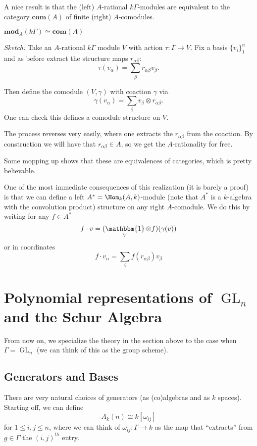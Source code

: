 \documentclass[12pt]{article}
\DeclareMathOperator{\1}{\mathbbm{1}}
\DeclareMathOperator{\GL}{GL}
\begin{document}
A nice result is that the (left) $A$-rational $k\Gamma$-modules are equivalent to the category $\mathbf{com}(A)$ of finite (right) $A$-comodules.
\begin{prop}\label{prop-modcomod}
	$\mathbf{mod}_A(k\Gamma)\simeq \mathbf{com}(A)$
\end{prop}
\begin{prf}
	\textit{Sketch:} Take an $A$-rational $k\Gamma$ module $V$ with action $\tau:\Gamma\to V$. Fix a basis $\{v_i\}_1^n$
	and as before extract the structure maps $r_{\alpha\beta}$:
	\[\tau(v_\alpha)=\sum_\beta r_{\alpha\beta} v_\beta.\]
	
	Then define the comodule $(V,\gamma)$ with coaction $\gamma$ via 
	\[\gamma(v_\alpha)=\sum_\beta v_\beta\otimes r_{\alpha\beta}.\]
	One can check this defines a comodule structure on $V$. 

	The process reverses very easily, where one extracts the $r_{\alpha\beta}$ from the coaction.
	By construction we will have that $r_{\alpha\beta}\in A$, so we get the $A$-rationality for free.

	Some mopping up shows that these are equivalences of categories, which is pretty believable. 
\end{prf}	
\begin{rmk}
	One of the most immediate consequences of this realization (it is barely a proof) is that we can define a left $A^\ast=\Hom_k(A,k)$-module (note that $A^\ast$ is a $k$-algebra with the convolution product)
	structure on any right $A$-comodule. We do this by writing for any $f\in A^\ast$
	\[f\cdot v=(\1_V\otimes f)(\gamma(v))\]
	or in coordinates 
	\[f\cdot v_\alpha=\sum_\beta f(r_{\alpha\beta})v_\beta\]
\end{rmk}

\section{Polynomial representations of \texorpdfstring{$\GL_n$}{GLn} and the Schur Algebra}
From now on, we specialize the theory in the section above to the case when $\Gamma=\GL_n$ (we can think of this as the group scheme). 

\subsection{Generators and Bases}
There are very natural choices of generators (as (co)algebras and as $k$ spaces). Starting off, we can define
\[A_k(n)\cong k[\omega_{ij}]\]
for $1\le i,j\le n$, where we can think of $\omega_{ij}:\Gamma\to k$ as the map that ``extracts'' from $g\in\Gamma$ the $(i,j)^{th}$ entry.
\end{document}
